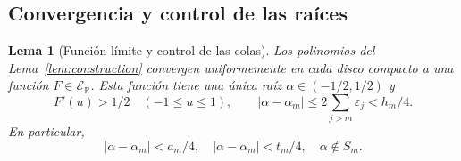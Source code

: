 \documentclass[11pt,a4paper]{article}
\numberwithin{equation}{section}
\newtheorem{lemma}[theorem]{Lema}
\theoremstyle{definition}
\theoremstyle{remark}
\newcommand{\R}{\mathbb R}
\newcommand{\ER}{\mathcal E_{\R}}
\begin{document}
\subsection{Convergencia y control de las raíces}
\begin{lemma}[Función límite y control de las colas]\label{lem:tails}
Los polinomios del Lema~\ref{lem:construction} convergen uniformemente en cada disco compacto a una función $F\in\ER$. Esta función tiene una única raíz $\alpha\in(-1/2,1/2)$ y
\[
F'(u)>1/2\quad(-1\le u\le1),\qquad
|\alpha-\alpha_m|\le2\sum_{j>m}\varepsilon_j<h_m/4.
\]
En particular,
\begin{equation}\label{eq:limitalpha}
|\alpha-\alpha_m|<a_m/4,\quad
|\alpha-\alpha_m|<t_m/4,\quad \alpha\notin S_m.
\end{equation}
\end{lemma}
\end{document}
